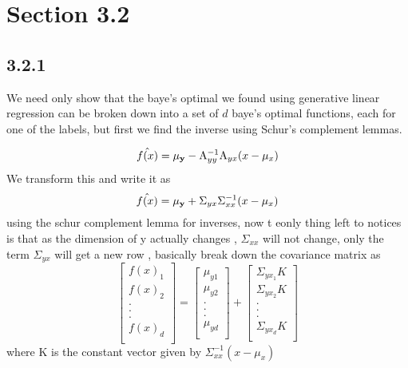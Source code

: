 \section{Section 3.2}
\subsection{3.2.1}
We need only show that the baye's optimal we found using generative linear regression can be broken down into  a set of $d$ baye's optimal functions, each for one of the labels, but first we find the inverse using Schur's complement lemmas.

\begin{equation}
    \hat{f(x)}  = \vb{\mu_y} - \mathrm{A}_{yy}^{-1}\mathrm{A}_{yx}(x - \mu_x)
\end{equation}
We transform this and write it as 
\begin{equation}
    \hat{f(x)}  = \vb{\mu_y} + {\Sigma}_{yx}{\Sigma}_{xx}^{-1}(x - \mu_x)
\end{equation}
using the schur complement lemma for inverses, now t eonly thing left to notices is that as the dimension of y actually changes , $\Sigma_{xx}$ will not change, only the term $\Sigma_{yx}$ will get a new row , basically break down the covariance matrix as 
\begin{equation}
    \begin{bmatrix}
    f(x)_1 \\
    f(x)_2 \\
    . \\
    . \\
    . \\
    f(x)_d \\
    \end{bmatrix}
     =   \begin{bmatrix}
    \mu_{y1} \\
    \mu_{y2} \\
    . \\
    . \\
    . \\
    \mu_{yd} \\
    \end{bmatrix}
      + 
        \begin{bmatrix}
    \Sigma_{yx_1}K \\
     \Sigma_{yx_2}K \\
    . \\
    . \\
    . \\
     \Sigma_{yx_d}K \\
    \end{bmatrix}
\end{equation}
where K is the constant vector given by $\Sigma_{xx}^{-1}(x - \mu_x)$

